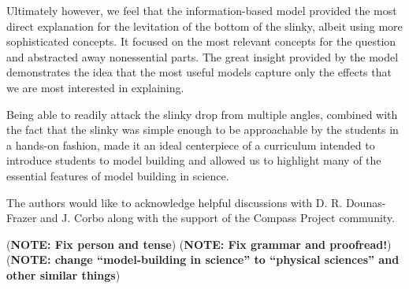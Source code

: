 \documentclass[prb,preprint]{revtex4-1}
\newcommand{\NOTE}[1]{\marginpar{\footnotesize\textbf{NOTE}} (\textbf{NOTE: #1})}
\begin{document}
Ultimately however, we feel that the information-based model provided the
most direct explanation for the levitation of the bottom of the slinky, albeit
using more sophisticated concepts. It focused
on the most relevant concepts for the question and abstracted away
nonessential parts. The great insight provided by the
model demonstrates the idea that the most useful models
capture only the effects that we are most interested in explaining.

Being able to readily attack the slinky drop from multiple angles, combined with
the fact that the slinky was simple enough to be approachable by the students
in a hands-on fashion, made it an ideal centerpiece of a curriculum intended to
introduce students to model building and allowed us to highlight many of the
essential features of model building in science.


\acknowledgments The authors would like to acknowledge helpful discussions with
D. R. Dounas-Frazer and J. Corbo along with the support of the Compass Project
community.

\NOTE{Fix person and tense}
\NOTE{Fix grammar and proofread!}
\NOTE{change ``model-building in science'' to ``physical sciences'' and other similar things}


\end{document}

